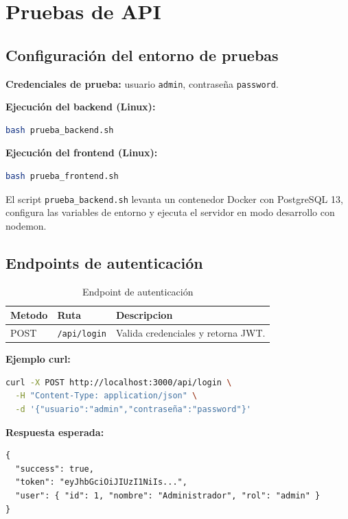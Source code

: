 \documentclass[12pt,a4paper]{report}
\begin{document}
\clearpage
\chapter{Pruebas de API}

\section{Configuración del entorno de pruebas}

\textbf{Credenciales de prueba:} usuario \texttt{admin}, contraseña \texttt{password}.

\textbf{Ejecución del backend (Linux):}
\begin{lstlisting}[language=bash]
bash prueba_backend.sh
\end{lstlisting}

\textbf{Ejecución del frontend (Linux):}
\begin{lstlisting}[language=bash]
bash prueba_frontend.sh
\end{lstlisting}

El script \texttt{prueba\_backend.sh} levanta un contenedor Docker con PostgreSQL 13, configura las variables de entorno y ejecuta el servidor en modo desarrollo con nodemon.

\pagebreak
\section{Endpoints de autenticación}

\begin{longtable}{@{}p{1.5cm}p{4cm}p{8cm}@{}}
  \caption{Endpoint de autenticación} \\
  \toprule
  \textbf{Metodo} & \textbf{Ruta} & \textbf{Descripcion} \\
  \midrule
  \endfirsthead
  POST & \texttt{/api/login} & Valida credenciales y retorna JWT. \\
  \bottomrule
\end{longtable}

\textbf{Ejemplo curl:}
\begin{lstlisting}[language=bash]
curl -X POST http://localhost:3000/api/login \
  -H "Content-Type: application/json" \
  -d '{"usuario":"admin","contraseña":"password"}'
\end{lstlisting}

\textbf{Respuesta esperada:}
\begin{lstlisting}
{
  "success": true,
  "token": "eyJhbGciOiJIUzI1NiIs...",
  "user": { "id": 1, "nombre": "Administrador", "rol": "admin" }
}
\end{lstlisting}
\end{document}
